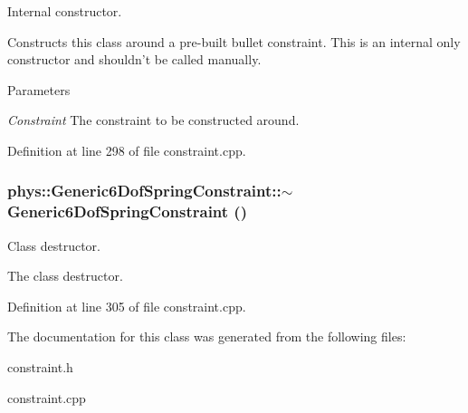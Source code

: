 Internal constructor. 

Constructs this class around a pre-\/built bullet constraint. This is an internal only constructor and shouldn't be called manually. 
\begin{DoxyParams}{Parameters}
\item[{\em Constraint}]The constraint to be constructed around. \end{DoxyParams}


Definition at line 298 of file constraint.cpp.

\hypertarget{classphys_1_1Generic6DofSpringConstraint_a245aa769d0b19ff01acf77e78e959cad}{
\subsubsection[{$\sim$Generic6DofSpringConstraint}]{\setlength{\rightskip}{0pt plus 5cm}phys::Generic6DofSpringConstraint::$\sim$Generic6DofSpringConstraint ()}}
\label{d1/dc7/classphys_1_1Generic6DofSpringConstraint_a245aa769d0b19ff01acf77e78e959cad}


Class destructor. 

The class destructor. 

Definition at line 305 of file constraint.cpp.



The documentation for this class was generated from the following files:\begin{DoxyCompactItemize}
\item 
constraint.h\item 
constraint.cpp\end{DoxyCompactItemize}

